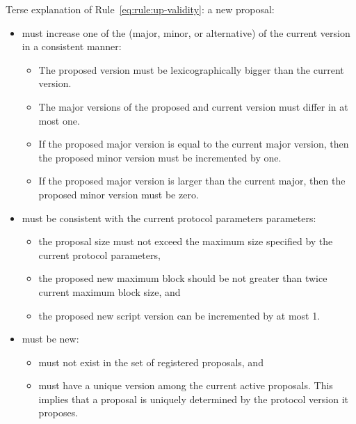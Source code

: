 Terse explanation of Rule~\ref{eq:rule:up-validity}: a new proposal:
\begin{itemize}
\item must increase one of the (major, minor, or alternative) of the
  current version in a consistent manner:
  \begin{itemize}
  \item The proposed version must be lexicographically bigger than the current
    version.
  \item The major versions of the proposed and current version must differ in
    at most one.
  \item If the proposed major version is equal to the current major
    version, then the proposed minor version must be incremented by one.
  \item If the proposed major version is larger than the current major, then
    the proposed minor version must be zero.
  \end{itemize}
\item must be consistent with the current protocol parameters parameters:
  \begin{itemize}
  \item the proposal size must not exceed the maximum size specified by
    the current protocol parameters,
  \item the proposed new maximum block should be not greater than twice current
    maximum block size, and
  \item the proposed new script version can be incremented by at most 1.
  \end{itemize}
\item must be new:
  \begin{itemize}
  \item must not exist in the set of registered proposals, and
  \item must have a unique version among the current active proposals. This
    implies that a proposal is uniquely determined by the protocol version it
    proposes.
  \end{itemize}
\end{itemize}


